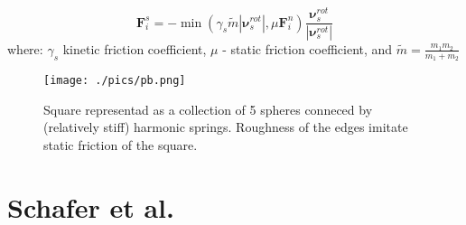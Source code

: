 \documentclass[10pt,a4paper]{article}
\begin{document}
\begin{equation}
\mathbf{F}^{s}_{i} = - \min(\gamma_{s} \tilde{m} |\mathbf{\nu}^{rot}_s| , \mu \mathbf{F}^{n}_{i} ) \frac{\mathbf{\nu}^{rot}_s}{|\mathbf{\nu}^{rot}_s|}
\end{equation}
where:
$\gamma_s$ kinetic friction coefficient, $\mu$ - static friction coefficient, and $\tilde{m} = \frac{m_1m_2}{m_1+m_2}$



\begin{figure}[tb]
\centering
\texttt{[image: ./pics/pb.png]}
\caption{Square representad as a collection of 5 spheres conneced by (relatively stiff) harmonic springs. Roughness of the edges imitate static friction of the square.}
\label{fig:pb}
\end{figure}

\section{Schafer et al. \cite{sw95, schafer96}}
\end{document}
